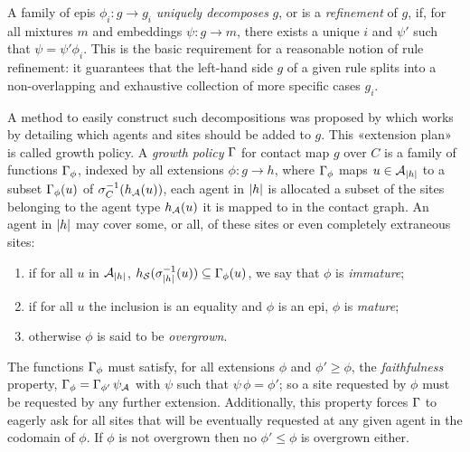 A family of epis $\phi_i: g \to g_i$ \emph{uniquely decomposes} $g$,
or is a \emph{refinement} of $g$, if,
for all mixtures $m$ and embeddings $\psi: g \to m$,
there exists a unique $i$ and $\psi'$ such that $\psi = \psi' \phi_i$.
This is the basic requirement
for a reasonable notion of rule refinement:
it guarantees that the left-hand side $g$ of a given rule
splits into a non-overlapping and exhaustive collection
of more specific cases $g_i$.


A method to easily construct such decompositions
was proposed by \citet{refinement}
which works by detailing
which agents and sites should be added to $g$.
This «extension plan» is called growth policy.
A \emph{growth policy} $\Gamma$ for contact map $g$ over $C$
is a family of functions $\Gamma_\phi$,
indexed by all extensions $\phi: g \to h$,
where $\Gamma_\phi$ maps $u \in \mathcal{A}_{\left|h\right|}$ to
a subset $\Gamma_\phi(u)$ of $\sigma_C^{-1}(h_{\mathcal{A}}(u))$,
\ie each agent in $\left|h\right|$ is allocated
a subset of the sites belonging to the agent type $h_{\mathcal{A}}(u)$
it is mapped to in the contact graph.
%
An agent in $\left|h\right|$ may cover some, or all,
of these sites or even completely extraneous sites:
\begin{enumerate}[label={(\roman*)}]
\item %
if for all $u$ in $\mathcal{A}_{\left|h\right|}$,
$h_{\mathcal{S}}(\sigma_{\left|h\right|}^{-1}(u)) \subseteq \Gamma_\phi(u)$,
we say that $\phi$ is \emph{immature};
\item if for all $u$ the inclusion is an equality
and $\phi$ is an epi,
$\phi$ is \emph{mature};
\item otherwise $\phi$ is said to be \emph{overgrown}.
\end{enumerate}
The functions $\Gamma_\phi$ must satisfy,
for all extensions $\phi$ and $\phi' \geq \phi$,
the \emph{faithfulness} property,
$\Gamma_\phi = \Gamma_{\phi'} \, \psi_{\mathcal{A}}$
with $\psi$ such that $\psi \, \phi = \phi'$;
so a site requested by $\phi$
must be requested by any further extension.
Additionally, this property forces $\Gamma$ to eagerly ask
for all sites that will be eventually requested
at any given agent in the codomain of $\phi$.
If $\phi$ is not overgrown
then no $\phi' \leq \phi$ is overgrown either.

